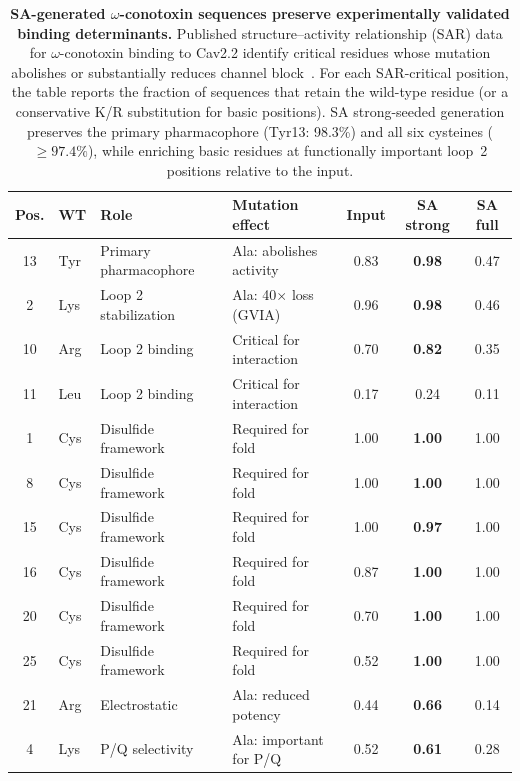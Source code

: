 \documentclass{article}
\theoremstyle{definition}
\theoremstyle{remark}
\begin{document}
\begin{table}[ht]
  \caption{\textbf{SA-generated $\omega$-conotoxin sequences preserve experimentally
  validated binding determinants.}
  Published structure--activity relationship (SAR) data for $\omega$-conotoxin
  binding to Cav2.2 identify critical residues whose mutation abolishes or
  substantially reduces channel block~\cite{kimTyr13Essential1995,satoBasicResidues1993,satoAlaScanMVIIC2000,schroederLys2Effects2012,lewisConotoxinSAR2012,schroederChiralityTyr131999}.
  For each SAR-critical position, the table reports the fraction of sequences that
  retain the wild-type residue (or a conservative K/R substitution for basic positions).
  SA strong-seeded generation preserves the primary pharmacophore (Tyr13: 98.3\%)
  and all six cysteines ($\geq 97.4\%$), while enriching basic residues at
  functionally important loop~2 positions relative to the input.}
  \label{tab:sar-agreement}
  \centering
  \small
  \begin{tabular}{clllccc}
    \toprule
    Pos. & WT & Role & Mutation effect & Input & SA strong & SA full \\
    \midrule
    13 & Tyr & Primary pharmacophore & Ala: abolishes activity & 0.83 & \textbf{0.98} & 0.47 \\
    2  & Lys & Loop 2 stabilization  & Ala: 40$\times$ loss (GVIA) & 0.96 & \textbf{0.98} & 0.46 \\
    10 & Arg & Loop 2 binding        & Critical for interaction & 0.70 & \textbf{0.82} & 0.35 \\
    11 & Leu & Loop 2 binding        & Critical for interaction & 0.17 & 0.24 & 0.11 \\
    1  & Cys & Disulfide framework   & Required for fold & 1.00 & \textbf{1.00} & 1.00 \\
    8  & Cys & Disulfide framework   & Required for fold & 1.00 & \textbf{1.00} & 1.00 \\
    15 & Cys & Disulfide framework   & Required for fold & 1.00 & \textbf{0.97} & 1.00 \\
    16 & Cys & Disulfide framework   & Required for fold & 0.87 & \textbf{1.00} & 1.00 \\
    20 & Cys & Disulfide framework   & Required for fold & 0.70 & \textbf{1.00} & 1.00 \\
    25 & Cys & Disulfide framework   & Required for fold & 0.52 & \textbf{1.00} & 1.00 \\
    21 & Arg & Electrostatic          & Ala: reduced potency & 0.44 & \textbf{0.66} & 0.14 \\
    4  & Lys & P/Q selectivity       & Ala: important for P/Q & 0.52 & \textbf{0.61} & 0.28 \\
    \bottomrule
  \end{tabular}
\end{table}
\end{document}
